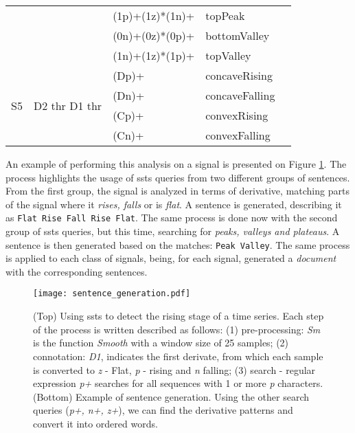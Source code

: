 \begin{table}
\begin{center}
\begin{tabularx}{\linewidth}{ XXXXX }
 & & (1p)+(1z)*(1n)+ & \textcolor{myblue2}{topPeak}\\
 & & (0n)+(0z)*(0p)+ & \textcolor{mypurple}{bottomValley}\\
 & & (1n)+(1z)*(1p)+ & \textcolor{myorange}{topValley}\\
 \hline
\multirow{4}{1em}{S5} & \multirow{4}{6em}{D2 thr D1 thr} & (Dp)+ & concaveRising\\
& & (Dn)+ & concaveFalling\\
& & (Cp)+ & convexRising\\
& &(Cn)+ & convexFalling\\
\bottomrule[1.5pt]
\end{tabularx}
\label{tab:ssts_queries}
\end{center}
\end{table}
 
An example of performing this analysis on a signal is presented on Figure \ref{fig:SSTS_example}. The process highlights the usage of \gls{ssts} queries from two different groups of sentences. From the first group, the signal is analyzed in terms of derivative, matching parts of the signal where it \textit{rises, falls} or is \textit{flat}. A sentence is generated, describing it as \texttt{Flat Rise Fall Rise Flat}. The same process is done now with the second group of \gls{ssts} queries, but this time, searching for \textit{peaks, valleys and plateaus}. A sentence is then generated based on the matches: \texttt{Peak Valley}. The same process is applied to each class of signals, being, for each signal, generated a \textit{document} with the corresponding sentences.

\begin{figure}[!h]
    \centering
    \texttt{[image: sentence\_generation.pdf]}
    \caption{(Top) Using \gls{ssts} to detect the rising stage of a time series. Each step of the process is written described as follows: (1) pre-processing: \textit{Sm} is the function \textit{Smooth} with a window size of 25 samples; (2) connotation: \textit{D1}, indicates the first derivate, from which each sample is converted to \textit{z} - Flat, \textit{p} - rising and \textit{n} falling; (3) search - regular expression \textit{p+} searches for all sequences with 1 or more \textit{p} characters. (Bottom) Example of sentence generation. Using the other search queries (\textit{p+, n+, z+}), we can find the derivative patterns and convert it into ordered words.}
    \label{fig:SSTS_example}
\end{figure}

